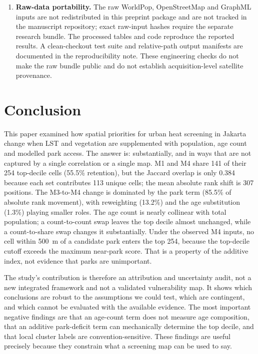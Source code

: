 \documentclass[times,twoside]{_Templates/MultiTargetManuscript}
\begin{document}
\begin{enumerate}
associations. They do not identify causal effects of parks, vegetation,
population or age on heat exposure or health. They do not estimate intervention
effectiveness, cost-effectiveness or distributional welfare.
\item \textbf{Raw-data portability.} The raw WorldPop, OpenStreetMap and GraphML
inputs are not redistributed in this preprint package and are not tracked in the
manuscript repository; exact raw-input hashes require the separate research
bundle. The processed tables and code reproduce the reported results. A
clean-checkout test suite and relative-path output manifests are documented in
the reproducibility note. These engineering checks do not make the raw bundle
public and do not establish acquisition-level satellite provenance.
\end{enumerate}

\section{Conclusion}

This paper examined how spatial priorities for urban heat screening in Jakarta
change when LST and vegetation are supplemented with population, age count and
modelled park access. The answer is: substantially, and in ways that are not
captured by a single correlation or a single map. M1 and M4 share 141 of their
254 top-decile cells (55.5\% retention), but the Jaccard overlap is only 0.384
because each set contributes 113 unique cells; the mean absolute rank shift is
307 positions. The
M3-to-M4 change is dominated by the park term (85.5\% of absolute rank movement),
with reweighting (13.2\%) and the age substitution (1.3\%) playing smaller roles.
The age count is nearly collinear with total population; a count-to-count swap
leaves the top decile almost unchanged, while a count-to-share swap changes it
substantially. Under the observed M4 inputs, no cell within 500~m of a candidate
park enters the top 254, because the top-decile cutoff exceeds the maximum
near-park score. That is a property of the additive index, not evidence that
parks are unimportant.

The study's contribution is therefore an attribution and uncertainty audit, not
a new integrated framework and not a validated vulnerability map. It shows which
conclusions are robust to the assumptions we could test, which are contingent,
and which cannot be evaluated with the available evidence. The most important
negative findings are that an age-count term does not measure age composition,
that an additive park-deficit term can mechanically determine the top decile,
and that local cluster labels are convention-sensitive. These findings are
useful precisely because they constrain what a screening map can be used to say.
\end{document}

